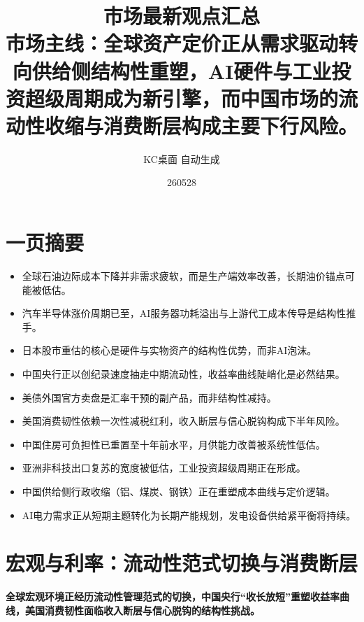 \documentclass[11pt]{ctexart}
\title{\textbf{市场最新观点汇总}\\[0.4em]{\large 市场主线：全球资产定价正从需求驱动转向供给侧结构性重塑，AI硬件与工业投资超级周期成为新引擎，而中国市场的流动性收缩与消费断层构成主要下行风险。}}
\author{KC桌面 自动生成}
\date{260528}
\begin{document}
\maketitle
\section*{一页摘要}
\begin{itemize}
  \item 全球石油边际成本下降并非需求疲软，而是生产端效率改善，长期油价锚点可能被低估。
  \item 汽车半导体涨价周期已至，AI服务器功耗溢出与上游代工成本传导是结构性推手。
  \item 日本股市重估的核心是硬件与实物资产的结构性优势，而非AI泡沫。
  \item 中国央行正以创纪录速度抽走中期流动性，收益率曲线陡峭化是必然结果。
  \item 美债外国官方卖盘是汇率干预的副产品，而非结构性减持。
  \item 美国消费韧性依赖一次性减税红利，收入断层与信心脱钩构成下半年风险。
  \item 中国住房可负担性已重置至十年前水平，月供能力改善被系统性低估。
  \item 亚洲非科技出口复苏的宽度被低估，工业投资超级周期正在形成。
  \item 中国供给侧行政收缩（铝、煤炭、钢铁）正在重塑成本曲线与定价逻辑。
  \item AI电力需求正从短期主题转化为长期产能规划，发电设备供给紧平衡将持续。
\end{itemize}
\section{宏观与利率：流动性范式切换与消费断层}
\textbf{全球宏观环境正经历流动性管理范式的切换，中国央行“收长放短”重塑收益率曲线，美国消费韧性面临收入断层与信心脱钩的结构性挑战。}
\end{document}
